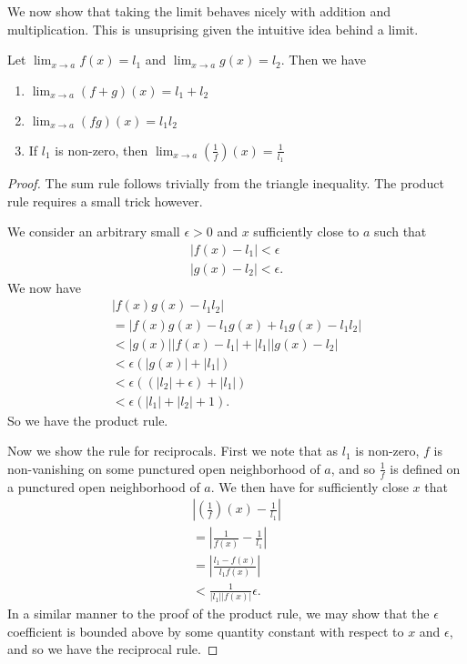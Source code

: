 \documentclass[]{article}
\begin{document}
We now show that taking the limit behaves nicely with addition and multiplication. This is unsuprising given the intuitive idea behind a limit.

\begin{thm} 
		Let $\lim_{x \to a} f(x) = l_1$ and $\lim_{x \to a} g(x) =l_2$. Then we have
		\begin{enumerate}
				\item $\lim_{x\to a} (f+g)(x) = l_1 + l_2$ 
				\item $\lim_{x\to a} (fg)(x) = l_1 l_2$ 
				\item If $l_1$ is non-zero, then $\lim_{x \to a} \left(\frac{1}{f}\right)(x) = \frac{1}{l_1}$
		\end{enumerate}
\end{thm}

\begin{proof}
		The sum rule follows trivially from the triangle inequality. The product rule requires a small trick however. 

		We consider an arbitrary small $\epsilon > 0$ and $x$ sufficiently close to $a$ such that 
		\begin{align*}
				|f(x) - l_1| < \epsilon \\
				|g(x) - l_2| < \epsilon.
		\end{align*}
		We now have
		\begin{align*}
				|f(x)g(x) - l_1l_2| \\
				= |f(x)g(x) - l_1 g(x) + l_1 g(x) - l_1 l_2| \\
				< |g(x)| |f(x) - l_1| + |l_1| |g(x) - l_2| \\
				< \epsilon (|g(x)| + |l_1|) \\
				< \epsilon( (|l_2| + \epsilon) + |l_1|) \\
				< \epsilon (|l_1| + |l_2| + 1).
		\end{align*}
		So we have the product rule.

		Now we show the rule for reciprocals. First we note that as $l_1$ is non-zero, $f$ is non-vanishing on some punctured open neighborhood of $a$, and so $\frac{1}{f}$ is defined on a punctured open neighborhood of $a$. We then have for sufficiently close $x$ that
		\begin{align*}
				|\left(\frac{1}{f}\right)(x) - \frac{1}{l_1}| \\
				= |\frac{1}{f(x)} - \frac{1}{l_1}| \\
				= |\frac{l_1 - f(x)}{l_1 f(x)}| \\
				< \frac{1}{|l_1||f(x)|} \epsilon.
		\end{align*}
		In a similar manner to the proof of the product rule, we may show that the $\epsilon$ coefficient is bounded above by some quantity constant with respect to $x$ and $\epsilon$, and so we have the reciprocal rule.
\end{proof}
\end{document}
